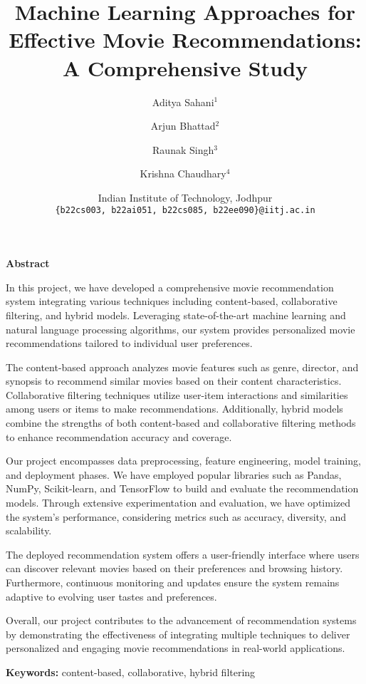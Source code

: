 \documentclass[a4paper]{article}
\title{ \textbf{Machine Learning Approaches for Effective Movie Recommendations: A Comprehensive Study} }
\author{Aditya Sahani$^1$ \and  Arjun Bhattad$^2$ \and Raunak Singh$^3$  \and  Krishna Chaudhary$^4$}
\date{
	Indian Institute of Technology, Jodhpur \\ \texttt{\{b22cs003, b22ai051, b22cs085, b22ee090\}@iitj.ac.in}\\%
	[2ex]%
}
\theoremstyle{plain}
\theoremstyle{definition}
\renewenvironment{abstract}
 {\Large\textbf{Abstract}\vspace{0.5em}\par\noindent\ignorespaces}
 {\par\vspace{0.5em}}
\begin{document}
	\maketitle
	
	\begin{abstract}
{\fontsize{11}{15}\selectfont
In this project, we have developed a comprehensive movie recommendation system integrating various techniques including content-based, collaborative filtering, and hybrid models. Leveraging state-of-the-art machine learning and natural language processing algorithms, our system provides personalized movie recommendations tailored to individual user preferences.

The content-based approach analyzes movie features such as genre, director, and synopsis to recommend similar movies based on their content characteristics. Collaborative filtering techniques utilize user-item interactions and similarities among users or items to make recommendations. Additionally, hybrid models combine the strengths of both content-based and collaborative filtering methods to enhance recommendation accuracy and coverage.

Our project encompasses data preprocessing, feature engineering, model training, and deployment phases. We have employed popular libraries such as Pandas, NumPy, Scikit-learn, and TensorFlow to build and evaluate the recommendation models. Through extensive experimentation and evaluation, we have optimized the system's performance, considering metrics such as accuracy, diversity, and scalability.

The deployed recommendation system offers a user-friendly interface where users can discover relevant movies based on their preferences and browsing history. Furthermore, continuous monitoring and updates ensure the system remains adaptive to evolving user tastes and preferences.

Overall, our project contributes to the advancement of recommendation systems by demonstrating the effectiveness of integrating multiple techniques to deliver personalized and engaging movie recommendations in real-world applications.}

		\vspace{2cm}	
		\noindent\textbf{Keywords:} content-based, collaborative, hybrid filtering
	\end{abstract}

	\tableofcontents
	\newpage
\end{document}
